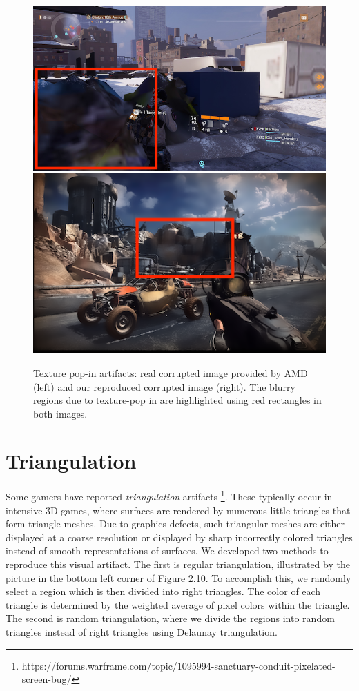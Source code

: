 \begin{figure}[!ht]
\includegraphics[scale=0.32]{images/tp1.png}
\includegraphics[scale=0.425]{images/tp2.png}
\vspace{5pt}
\caption[Texture pop-in artifacts]{Texture pop-in artifacts: real corrupted image provided by AMD (left) and our reproduced corrupted image (right). The blurry regions due to texture-pop in are highlighted using red rectangles in both images.}
\label{fig:tp}
\end{figure}



\section*{Triangulation}
Some gamers have reported \textit{triangulation} artifacts \footnote{https://forums.warframe.com/topic/1095994-sanctuary-conduit-pixelated-screen-bug/}. These typically occur in intensive 3D games, where surfaces are rendered by numerous little triangles that form triangle meshes. Due to graphics defects, such triangular meshes are either displayed at a coarse resolution or displayed by sharp incorrectly colored triangles instead of smooth representations of surfaces. We developed two methods to reproduce this visual artifact. The first is regular triangulation, illustrated by the picture in the bottom left corner of Figure 2.10. To accomplish this, we randomly select a region which is then  divided into right triangles. The color of each triangle is determined by the weighted average of pixel colors within the triangle. The second is random triangulation, where we divide the regions into random triangles instead of right triangles using Delaunay triangulation\cite{delauny}.


